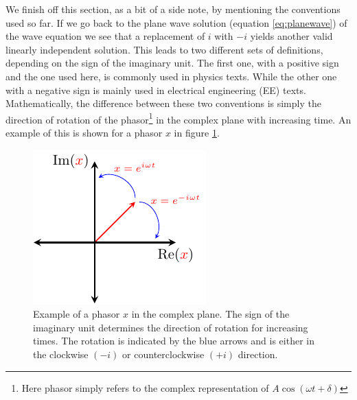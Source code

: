 We finish off this section, as a bit of a side note, by mentioning the conventions used so far. If we go back to the plane wave solution (equation \ref{eq:planewave}) of the wave equation we see that a replacement of $i$ with $-i$ yields another valid linearly independent solution. This leads to two different sets of definitions, depending on the sign of the imaginary unit. The first one, with a positive sign and the one used here, is commonly used in physics texts. While the other one with a negative sign is mainly used in electrical engineering (EE) texts. Mathematically, the difference between these two conventions is simply the direction of rotation of the phasor\footnote{Here phasor simply refers to the complex representation of $A\cos(\omega t + \delta)$} in the complex plane with increasing time. An example of this is shown for a phasor $x$ in figure \ref{fig:phasor}. 

\begin{figure}[h]
    \centering
    \includegraphics[scale=1.3]{images/theory/tikz_phasor_rotation.pdf}
    \caption{Example of a phasor $x$ in the complex plane. The sign of the imaginary unit determines the direction of rotation for increasing times. The rotation is indicated by the blue arrows and is either in the clockwise $(-i)$ or counterclockwise $(+i)$ direction.}
    \label{fig:phasor}
\end{figure}


